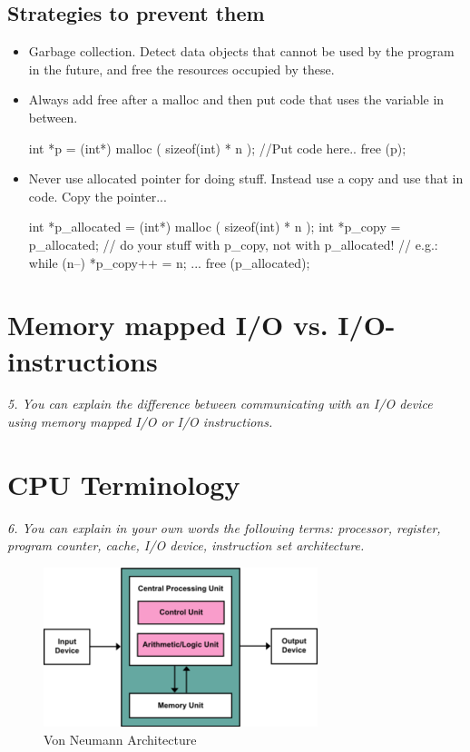 \documentclass{article}
\begin{document}
\subsection{Strategies to prevent them}
\begin{itemize}
	\item Garbage collection. Detect data objects that cannot be used by the program in the future, and free the resources occupied by these.
	\item Always add free after a malloc and then put code that uses the variable in between.
	\begin{cpp}
int *p = (int*) malloc ( sizeof(int) * n );
//Put code here..
free (p);
	\end{cpp}
	\item Never use allocated pointer for doing stuff. Instead use a copy and use that in code. Copy the pointer...
	\begin{cpp}
int *p_allocated = (int*) malloc ( sizeof(int) * n );
int *p_copy = p_allocated;
// do your stuff with p_copy, not with p_allocated!
// e.g.:
while (n--) { *p_copy++ = n; }
...
free (p_allocated);
	\end{cpp}
\end{itemize}


\section{Memory mapped I/O vs. I/O-instructions}
\emph{5. You can explain the difference between communicating with an I/O device using memory mapped I/O or I/O instructions.}



\section{CPU Terminology}
\emph{6. You can explain in your own words the following terms: processor, register, program counter, cache, I/O device, instruction set architecture.}

\begin{figure}[H]
  \centering
  \includegraphics[width=8.0cm]{images/330px-Von_Neumann_Architecture.png}
  \caption{Von Neumann Architecture}
\end{figure}
\end{document}
